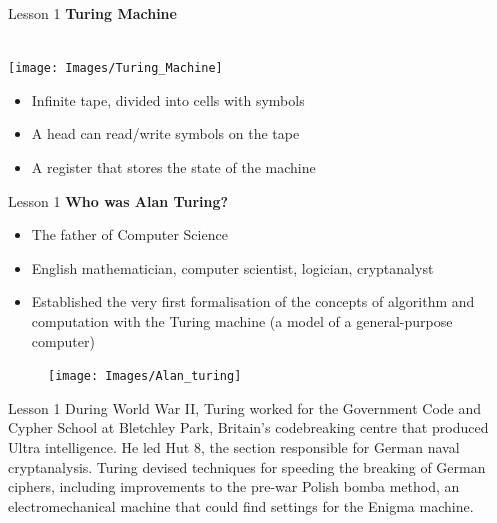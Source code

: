 \documentclass[aspectratio=1610]{beamer}
\begin{document}
\begin{frame}{Lesson 1}{}
{\Large\textbf{{Turing Machine}}}\\~\\
\begin{minipage}{0.57\textwidth}
\texttt{[image: Images/Turing\_Machine]}
\end{minipage}
\Large
\begin{minipage}{0.42\textwidth}
    \begin{itemize}
      \item Infinite tape, divided into cells with symbols
      \item A head can read/write symbols on the tape
      \item A register that stores the state of the machine
    \end{itemize}
  \end{minipage}
\end{frame}



\begin{frame}{Lesson 1}{}
{\LARGE\textbf{{Who was Alan Turing?}}}
\Large
\begin{minipage}{0.70\textwidth}
    \begin{itemize}
      \item The father of Computer Science
      \item English mathematician, computer scientist, logician, cryptanalyst
      \item Established the very first formalisation of the concepts of algorithm and computation with the Turing machine (a model of a general-purpose computer)
     \end{itemize}
  \end{minipage}
\begin{minipage}{.0\textwidth}
      \begin{figure}
        \texttt{[image: Images/Alan\_turing]}
      \end{figure}
  \end{minipage}  
\end{frame}


\begin{frame}{Lesson 1}{}
\LARGE
During World War II, Turing worked for the Government Code and Cypher
School at Bletchley Park, Britain's codebreaking centre that produced
Ultra intelligence. He led Hut 8, the section responsible for German
naval cryptanalysis. Turing devised techniques for speeding the
breaking of German ciphers, including improvements to the pre-war
Polish bomba method, an electromechanical machine that could find
settings for the Enigma machine. 
\end{frame}
\end{document}
